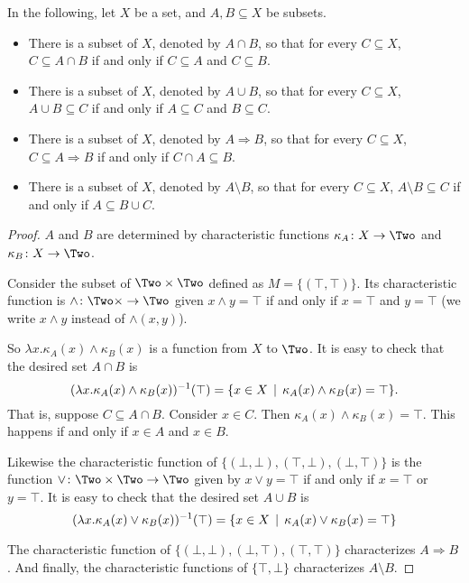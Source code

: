 \begin{lemma}
	In the following, let $X$ be a set, and $A,B\subseteq X$ be subsets.
	\begin{itemize}
		\item There is a subset of $X$, denoted by $A\cap B$, so that for every $C\subseteq X$, $C\subseteq A\cap B$ if and only if $C\subseteq A$ and $C\subseteq B$.
		\item There is a subset of $X$, denoted by $A\cup B$, so that for every $C\subseteq X$, $A\cup B\subseteq C$ if and only if $A\subseteq C$ and $B\subseteq C$.
		\item There is a subset of $X$, denoted by $A\Rightarrow B$, so that for every $C\subseteq X$, $C\subseteq A\Rightarrow B$ if and only if $C\cap A\subseteq B$.
		\item There is a subset of $X$, denoted by $A\setminus B$, so that for every $C\subseteq X$, $A\setminus B\subseteq C$ if and only if $A\subseteq B\cup C$.
	\end{itemize}
	
	\begin{proof}
		$A$ and $B$ are determined by characteristic functions $\fromto{\kappa_A}X\Two$ and $\fromto {\kappa_B}X\Two$. 
		
		Consider the subset of $\Two\times \Two$ defined as $M= \{(\top,\top)\}$. Its characteristic function is $\fromto {\mathord\wedge}{\Two\times}{\Two}$ given $x\wedge y = \top$
		if and only if $x=\top$ and $y=\top$ (we write $x\wedge y$ instead of $\mathord\wedge(x,y)$).
		
		So $\lambda x.\kappa_A(x)\wedge\kappa_B(x)$ is a function from $X$ to $\Two$. It is easy to check that the desired set $A\cap B$ is 
		\[(\lambda x.\kappa_A(x)\wedge\kappa_B(x))^{-1}(\top) = \{x\in X\,\mid\, \kappa_A(x)\wedge\kappa_B(x) = \top \}.\]
		That is, suppose $C\subseteq A\cap B$. Consider $x\in C$. Then $\kappa_A(x)\wedge \kappa_B(x)=\top$. This happens if and only if 
		$x\in A$ and $x\in B$. 

		Likewise the characteristic function of $\{(\bot,\bot),(\top,\bot),(\bot,\top)\}$ is the function $\fromto {\mathord\vee}{\Two\times \Two}\Two$ given by $x\vee y = \top$ if and only if $x=\top$ or $y=\top$. It is easy to check that the desired set $A\cup B$
		is \[(\lambda x.\kappa_A(x)\vee\kappa_B(x))^{-1}(\top) = \{x\in X\,\mid\, \kappa_A(x)\vee\kappa_B(x)=\top\}\]
		
		The characteristic function of $\{(\bot,\bot),(\bot,\top),(\top,\top)\}$ characterizes $A\Rightarrow B$. 
		And finally, the characteristic functions of $\{\top,\bot\}$ characterizes $A\setminus B$. 
	\end{proof}
\end{lemma}

